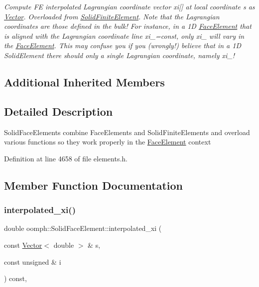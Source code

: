 \begin{DoxyCompactItemize}
\begin{DoxyCompactList}\small\item\em Compute FE interpolated Lagrangian coordinate vector xi\mbox{[}\mbox{]} at local coordinate s as \hyperlink{classoomph_1_1Vector}{Vector}. Overloaded from \hyperlink{classoomph_1_1SolidFiniteElement}{Solid\+Finite\+Element}. Note that the Lagrangian coordinates are those defined in the bulk! For instance, in a 1D \hyperlink{classoomph_1_1FaceElement}{Face\+Element} that is aligned with the Lagrangian coordinate line xi\+\_=const, only xi\+\_ will vary in the \hyperlink{classoomph_1_1FaceElement}{Face\+Element}. This may confuse you if you (wrongly!) believe that in a 1D Solid\+Element there should only a single Lagrangian coordinate, namely xi\+\_! \end{DoxyCompactList}\end{DoxyCompactItemize}
\subsection*{Additional Inherited Members}


\subsection{Detailed Description}
Solid\+Face\+Elements combine Face\+Elements and Solid\+Finite\+Elements and overload various functions so they work properly in the \hyperlink{classoomph_1_1FaceElement}{Face\+Element} context 

Definition at line 4658 of file elements.\+h.



\subsection{Member Function Documentation}
\mbox{\label{classoomph_1_1SolidFaceElement_ace3eb64ce511c869bd140922b6597667}} 
\subsubsection{\texorpdfstring{interpolated\+\_\+xi()}{interpolated\_xi()}\hspace{0.1cm}{\footnotesize\ttfamily [1/2]}}
{\footnotesize\ttfamily double oomph\+::\+Solid\+Face\+Element\+::interpolated\+\_\+xi (\begin{DoxyParamCaption}\item[{const \hyperlink{classoomph_1_1Vector}{Vector}$<$ double $>$ \&}]{s,  }\item[{const unsigned \&}]{i }\end{DoxyParamCaption}) const\hspace{0.3cm}{\ttfamily [inline]}, {\ttfamily [virtual]}}



